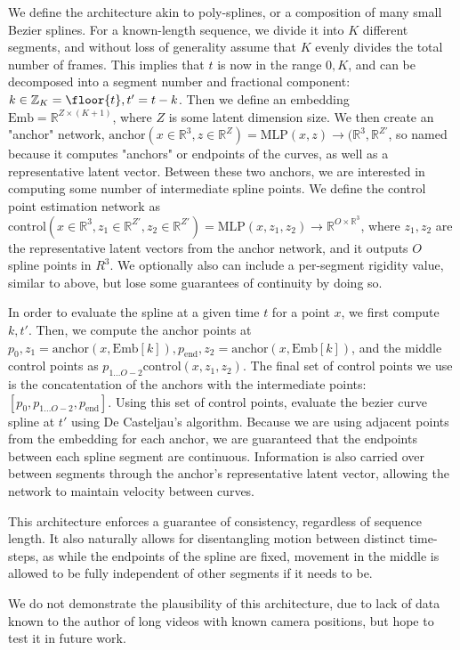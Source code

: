 We define the architecture akin to poly-splines, or a composition of many small Bezier splines.
For a known-length sequence, we divide it into $K$ different segments, and without loss of
generality assume that $K$ evenly divides the total number of frames. This implies that $t$ is
now in the range $0, K$, and can be decomposed into a segment number and fractional component:
$k\in\mathbb{Z}_K=\floor{t}, t'=t-k$.
Then we define an embedding $\text{Emb} = \mathbb{R}^{Z\times(K+1)}$, where $Z$ is some latent
dimension size. We then create an "anchor" network,
$\text{anchor}(x\in\mathbb{R}^3,z\in\mathbb{R}^Z) =
\text{MLP}(x,z)\to(\mathbb{R}^3,\mathbb{R}^{Z'}$, so named because it computes "anchors"
or endpoints of the curves, as well as a representative latent vector. Between these two
anchors, we are interested in computing some number of intermediate spline points. We define the
control point estimation network as $\text{control}(x\in\mathbb{R}^3, z_1\in\mathbb{R}^{Z'},
z_2\in\mathbb{R}^{Z'}) = \text{MLP}(x,z_1,z_2)\to\mathbb{R}^{O\times\mathbb{R}^3}$, where $z_1,z_2$ are the
representative latent vectors from the anchor network, and it outputs $O$ spline points in
$R^3$. We optionally also can include a per-segment rigidity value, similar to above, but lose
some guarantees of continuity by doing so.

In order to evaluate the spline at a given time $t$ for a point $x$, we first compute $k, t'$. Then, we compute
the anchor points at
$p_0,z_1=\text{anchor}(x,\text{Emb}[k]),p_\text{end},z_2=\text{anchor}(x,\text{Emb}[k])$, and
the middle control points as $p_{1\ldots O-2}\text{control}(x,z_1,z_2)$. The final set of control points we use
is the concatentation of the anchors with the intermediate points:
$[p_0, p_{1\ldots O-2}, p_\text{end}]$. Using this set of control points, evaluate the bezier
curve spline at $t'$ using De Casteljau's algorithm. Because we are using adjacent points from
the embedding for each anchor, we are guaranteed that the endpoints between each spline segment
are continuous. Information is also carried over between segments through the anchor's
representative latent vector, allowing the network to maintain velocity between curves.

This architecture enforces a guarantee of consistency, regardless of sequence length. It also
naturally allows for disentangling motion between distinct time-steps, as while the endpoints of
the spline are fixed, movement in the middle is allowed to be fully independent of other
segments if it needs to be.

We do not demonstrate the plausibility of this architecture, due to lack of data known to the
author of long videos with known camera positions, but hope to test it in future work.
